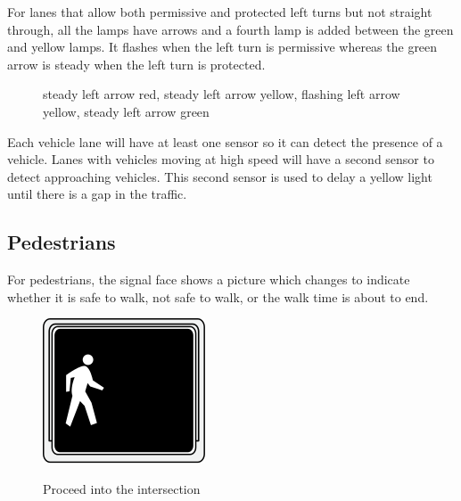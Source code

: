 \documentclass[letterpaper,twoside]{article}
\begin{document}
For lanes that allow both permissive and protected left turns but not
straight through, all the lamps have arrows and
a fourth lamp is added between the green and yellow lamps.  It flashes
when the left turn is permissive whereas the green arrow is steady
when the left turn is protected.

\begin{figure}[H]
           {\caption{steady left arrow red, steady left arrow yellow, flashing
               left arrow yellow, steady left arrow green}\label{four_B}}
\end{figure}

Each vehicle lane will have at least one sensor so it can detect the
presence of a vehicle.  Lanes with vehicles moving at high speed will
have a second sensor to detect approaching vehicles.  This second sensor
is used to delay a yellow light until there is a gap in the traffic.

\subsection{Pedestrians}
For pedestrians, the signal face shows a picture which changes to indicate
whether it is safe to walk, not safe to walk, or the walk time is about to end.

\begin{figure}[H]
  \fcapside
           {\includegraphics{MUTCD_Ped_Signal_-_Walk}}
           {\caption{Proceed into the intersection}}
\end{figure}
\end{document}
